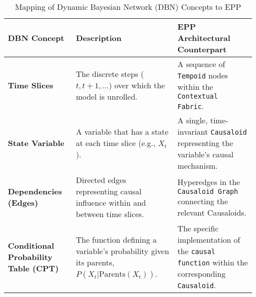 \begin{table}[h!]
\centering
\caption{Mapping of Dynamic Bayesian Network (DBN) Concepts to EPP}
\label{tab:dbn_mapping}
\begin{tabular}{|l|p{5.5cm}|p{5.5cm}|}
\hline
\textbf{DBN Concept} & \textbf{Description} & \textbf{EPP Architectural Counterpart} \\
\hline
\textbf{Time Slices} &
The discrete steps ($t, t+1, \dots$) over which the model is unrolled. &
A sequence of \texttt{Tempoid} nodes within the \texttt{Contextual Fabric}. \\
\hline
\textbf{State Variable} &
A variable that has a state at each time slice (e.g., $X_t$). &
A single, time-invariant \texttt{Causaloid} representing the variable's causal mechanism. \\
\hline
\textbf{Dependencies (Edges)} &
Directed edges representing causal influence within and between time slices. &
Hyperedges in the \texttt{Causaloid Graph} connecting the relevant Causaloids. \\
\hline
\textbf{Conditional Probability Table (CPT)} &
The function defining a variable's probability given its parents, $P(X_t | \text{Parents}(X_t))$. &
The specific implementation of the \texttt{causal function} within the corresponding \texttt{Causaloid}. \\
\hline
\end{tabular}
\end{table}



\newpage
